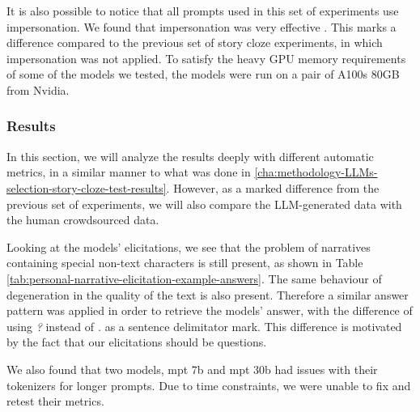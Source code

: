 It is also possible to notice that all prompts used in this set of experiments use impersonation. We found that impersonation was very effective \cite{impersonation}. This marks a difference compared to the previous set of story cloze experiments, in which impersonation was not applied.
To satisfy the heavy GPU memory requirements of some of the models we tested, the models were run on a pair of A100s 80GB from Nvidia.
\subsubsection{Results}
\label{cha:methodology-personal-narrative-elicitation-results}
In this section, we will analyze the results deeply with different automatic metrics, in a similar manner to what was done in \ref{cha:methodology-LLMs-selection-story-cloze-test-results}. However, as a marked difference from the previous set of experiments, we will also compare the LLM-generated data with the human crowdsourced data.


Looking at the models' elicitations, we see that the problem of narratives containing special non-text characters is still present, as shown in Table \ref{tab:personal-narrative-elicitation-example-answers}. The same behaviour of degeneration in the quality of the text is also present. Therefore a similar answer pattern was applied in order to retrieve the models' answer, with the difference of using \emph{?} instead of \emph{.} as a sentence delimitator mark. This difference is motivated by the fact that our elicitations should be questions.
% 

We also found that two models, mpt 7b and mpt 30b had issues with their tokenizers for longer prompts. Due to time constraints, we were unable to fix and retest their metrics.

